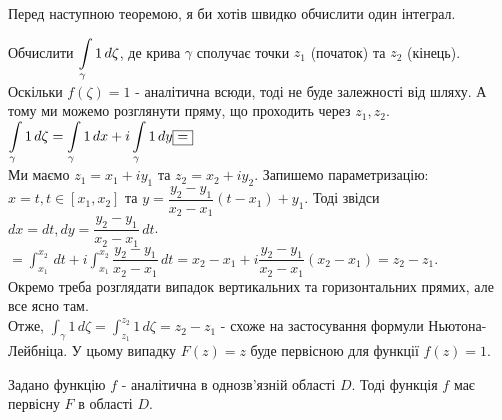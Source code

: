 \documentclass{math_library}
\begin{document}
Перед наступною теоремою, я би хотів швидко обчислити один інтеграл.

\begin{example}
Обчислити $\displaystyle\int\displaylimits_\gamma 1\,d\zeta$, де крива $\gamma$ сполучає точки $z_1$ (початок) та $z_2$ (кінець).\\
Оскільки $f(\zeta) = 1$ - аналітична всюди, тоді не буде залежності від шляху. А тому ми можемо розглянути пряму, що проходить через $z_1,z_2$.\\
$\displaystyle\int\displaylimits_\gamma 1\,d\zeta = \int\displaylimits_\gamma 1 \,dx + i \int\displaylimits_\gamma 1\,dy \boxed{=}$\\
Ми маємо $z_1 = x_1+iy_1$ та $z_2 = x_2+iy_2$. Запишемо параметризацію:\\
$x = t, t \in [x_1,x_2]$ та $y = \dfrac{y_2-y_1}{x_2-x_1}(t-x_1) + y_1$. Тоді звідси $dx = dt, dy = \dfrac{y_2-y_1}{x_2-x_1}\,dt$.\\
$\boxed{=} \displaystyle\int_{x_1}^{x_2}\,dt + i \int_{x_1}^{x_2} \dfrac{y_2-y_1}{x_2-x_1}\,dt = x_2-x_1 + i \dfrac{y_2-y_1}{x_2-x_1}(x_2-x_1) = z_2 - z_1$.\\
Окремо треба розглядати випадок вертикальних та горизонтальних прямих, але все ясно там.\\
Отже, $\displaystyle\int_\gamma 1\,d\zeta = \int_{z_1}^{z_2} 1\,d\zeta = z_2-z_1$ - схоже на застосування формули Ньютона-Лейбніца. У цьому випадку $F(z) = z$ буде первісною для функції $f(z) = 1$.
\end{example}

\begin{theorem}
Задано функцію $f$ - аналітична в однозв'язній області $D$. Тоді функція $f$ має первісну $F$ в області $D$.
\end{theorem}
\end{document}
